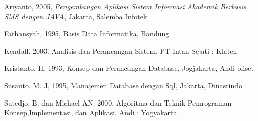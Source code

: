 \documentclass{jtetiproposalskripsi}
\begin{document}
\begin{thebibliography}{9}

Ariyanto, 2005, \textit{Pengembangan Aplikasi Sistem Informasi Akademik Berbasis SMS dengan JAVA}, Jakarta, Salemba Infotek

Fathansyah, 1995, Basis Data Informatika, Bandung

Kendall. 2003. Analisis dan Perancangan Sistem. PT Intan Sejati : Klaten

Kristanto. H, 1993, Konsep dan Perancangan Database, Jogjakarta, Andi offset

Susanto. M. J, 1995, Manajemen Database dengan Sql, Jakarta, Dinastindo

Sutedjo, B. dan Michael AN. 2000. Algoritma dan Teknik Pemrograman Konsep,Implementasi, dan Aplikasi. Andi : Yogyakarta

\end{thebibliography}
\end{document}
